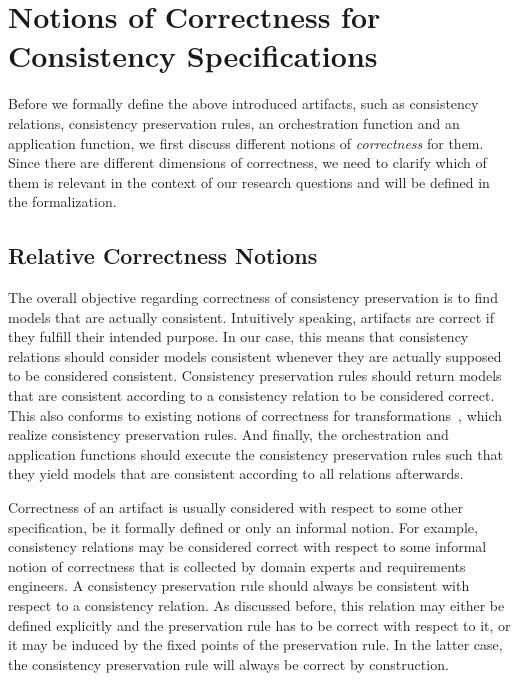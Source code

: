 \section{Notions of Correctness for Consistency Specifications}
\label{chap:correctness:notions_correctness}

Before we formally define the above introduced artifacts, such as consistency relations, consistency preservation rules, an orchestration function and an application function, we first discuss different notions of \emph{correctness} for them.
Since there are different dimensions of correctness, we need to clarify which of them is relevant in the context of our research questions and will be defined in the formalization.


\subsection{Relative Correctness Notions}

The overall objective regarding correctness of consistency preservation is to find models that are actually consistent.
Intuitively speaking, artifacts are correct if they fulfill their intended purpose. 
In our case, this means that consistency relations should consider models consistent whenever they are actually supposed to be considered consistent.
Consistency preservation rules should return models that are consistent according to a consistency relation to be considered correct.
This also conforms to existing notions of correctness for transformations~\cite{stevens2010sosym}, which realize consistency preservation rules.
And finally, the orchestration and application functions should execute the consistency preservation rules such that they yield models that are consistent according to all relations afterwards.

Correctness of an artifact is usually considered with respect to some other specification, be it formally defined or only an informal notion.
For example, consistency relations may be considered correct with respect to some informal notion of correctness that is collected by domain experts and requirements engineers.
A consistency preservation rule should always be consistent with respect to a consistency relation. As discussed before, this relation may either be defined explicitly and the preservation rule has to be correct with respect to it, or it may be induced by the fixed points of the preservation rule.
In the latter case, the consistency preservation rule will always be correct by construction.


